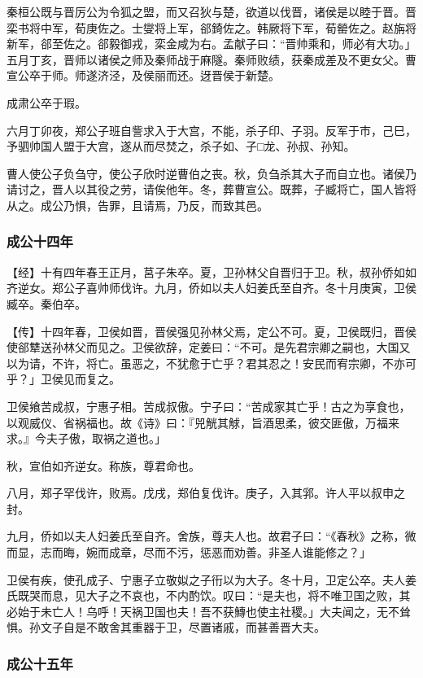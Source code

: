\documentclass[]{article}
\begin{document}
秦桓公既与晋厉公为令狐之盟，而又召狄与楚，欲道以伐晋，诸侯是以睦于晋。晋栾书将中军，荀庚佐之。士燮将上军，郤錡佐之。韩厥将下军，荀罃佐之。赵旃将新军，郤至佐之。郤毅御戎，栾金咸为右。孟献子曰：``晋帅乘和，师必有大功。」五月丁亥，晋师以诸侯之师及秦师战于麻隧。秦师败绩，获秦成差及不更女父。曹宣公卒于师。师遂济泾，及侯丽而还。迓晋侯于新楚。

成肃公卒于瑕。

六月丁卯夜，郑公子班自訾求入于大宫，不能，杀子印、子羽。反军于市，己巳，予驷帅国人盟于大宫，遂从而尽焚之，杀子如、子□龙、孙叔、孙知。

曹人使公子负刍守，使公子欣时逆曹伯之丧。秋，负刍杀其大子而自立也。诸侯乃请讨之，晋人以其役之劳，请俟他年。冬，葬曹宣公。既葬，子臧将亡，国人皆将从之。成公乃惧，告罪，且请焉，乃反，而致其邑。

\hypertarget{header-n1705}{%
\subsubsection{成公十四年}\label{header-n1705}}

【经】十有四年春王正月，莒子朱卒。夏，卫孙林父自晋归于卫。秋，叔孙侨如如齐逆女。郑公子喜帅师伐许。九月，侨如以夫人妇姜氏至自齐。冬十月庚寅，卫侯臧卒。秦伯卒。

【传】十四年春，卫侯如晋，晋侯强见孙林父焉，定公不可。夏，卫侯既归，晋侯使郤犨送孙林父而见之。卫侯欲辞，定姜曰：``不可。是先君宗卿之嗣也，大国又以为请，不许，将亡。虽恶之，不犹愈于亡乎？君其忍之！安民而宥宗卿，不亦可乎？」卫侯见而复之。

卫侯飨苦成叔，宁惠子相。苦成叔傲。宁子曰：``苦成家其亡乎！古之为享食也，以观威仪、省祸福也。故《诗》曰：『兕觥其觩，旨酒思柔，彼交匪傲，万福来求。』今夫子傲，取祸之道也。」

秋，宣伯如齐逆女。称族，尊君命也。

八月，郑子罕伐许，败焉。戊戌，郑伯复伐许。庚子，入其郛。许人平以叔申之封。

九月，侨如以夫人妇姜氏至自齐。舍族，尊夫人也。故君子曰：``《春秋》之称，微而显，志而晦，婉而成章，尽而不污，惩恶而劝善。非圣人谁能修之？」

卫侯有疾，使孔成子、宁惠子立敬姒之子衎以为大子。冬十月，卫定公卒。夫人姜氏既哭而息，见大子之不哀也，不内酌饮。叹曰：``是夫也，将不唯卫国之败，其必始于未亡人！乌呼！天祸卫国也夫！吾不获鱄也使主社稷。」大夫闻之，无不耸惧。孙文子自是不敢舍其重器于卫，尽置诸戚，而甚善晋大夫。

\hypertarget{header-n1715}{%
\subsubsection{成公十五年}\label{header-n1715}}
\end{document}
